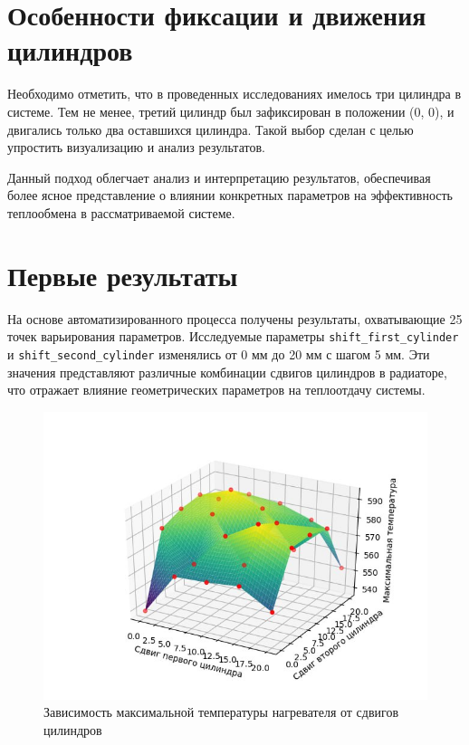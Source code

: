 \documentclass[a4paper,12pt]{extreport}
\numberwithin{equation}{chapter}
\begin{document}
\section{Особенности фиксации и движения цилиндров}

Необходимо отметить, что в проведенных исследованиях имелось три цилиндра в системе. Тем не менее, третий цилиндр был зафиксирован в положении (0, 0), и двигались только два оставшихся цилиндра. Такой выбор сделан с целью упростить визуализацию и анализ результатов.

Данный подход облегчает анализ и интерпретацию результатов, обеспечивая более ясное представление о влиянии конкретных параметров на эффективность теплообмена в рассматриваемой системе.

\section{Первые результаты}

На основе автоматизированного процесса получены результаты, охватывающие 25 точек варьирования параметров. Исследуемые параметры \texttt{shift\_first\_cylinder} и \texttt{shift\_second\_cylinder} изменялись от 0 мм до 20 мм с шагом 5 мм.
Эти значения представляют различные комбинации сдвигов цилиндров в радиаторе, что отражает влияние геометрических параметров на теплоотдачу системы.

\begin{figure}[h]
	\begin{center}
		\includegraphics[width=0.4\linewidth]{images/16.1.jpg}
		\caption{Зависимость максимальной температуры нагревателя от сдвигов цилиндров} %
	\end{center}
\end{figure}
\end{document}
